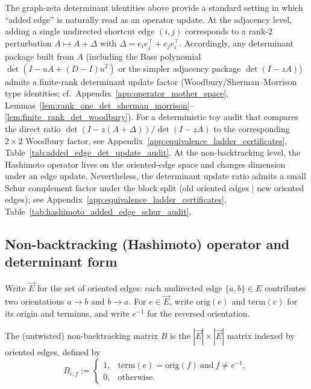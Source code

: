 \begin{remark}
\AuditTag The graph-zeta determinant identities above provide a standard setting in which ``added edge'' is naturally read as an operator update.
At the adjacency level, adding a single undirected shortcut edge $(i,j)$ corresponds to a rank-$2$ perturbation $A\mapsto A+\Delta$ with
$\Delta=e_ie_j^\top+e_je_i^\top$.
Accordingly, any determinant package built from $A$ (including the Bass polynomial $\det(I-uA+(D-I)u^2)$ or the simpler adjacency package $\det(I-zA)$)
admits a finite-rank determinant update factor (Woodbury/Sherman--Morrison type identities; cf.\ Appendix~\ref{app:operator_mother_space},
Lemmas~\ref{lem:rank_one_det_sherman_morrison}--\ref{lem:finite_rank_det_woodbury}).
For a deterministic toy audit that compares the direct ratio $\det(I-z(A+\Delta))/\det(I-zA)$ to the corresponding $2\times2$ Woodbury factor, see
Appendix~\ref{app:equivalence_ladder_certificates}, Table~\ref{tab:added_edge_det_update_audit}.
\AuditTag At the non-backtracking level, the Hashimoto operator lives on the oriented-edge space and changes dimension under an edge update.
Nevertheless, the determinant update ratio admits a small Schur complement factor under the block split (old oriented edges | new oriented edges);
see Appendix~\ref{app:equivalence_ladder_certificates}, Table~\ref{tab:hashimoto_added_edge_schur_audit}.
\end{remark}

\subsection{Non-backtracking (Hashimoto) operator and determinant form}
\label{subsec:hashimoto_operator_det_form}

Write $\overrightarrow{E}$ for the set of oriented edges: each undirected edge $\{a,b\}\in E$ contributes two orientations $a\to b$ and $b\to a$.
For $e\in\overrightarrow{E}$, write $\mathrm{orig}(e)$ and $\mathrm{term}(e)$ for its origin and terminus, and write $e^{-1}$ for the reversed orientation.

\begin{definition}\label{def:hashimoto_matrix}
\MathTag The (untwisted) non-backtracking matrix $B$ is the $|\overrightarrow{E}|\times|\overrightarrow{E}|$ matrix indexed by oriented edges, defined by
\[
B_{e,f}:=
\begin{cases}
1, & \mathrm{term}(e)=\mathrm{orig}(f)\ \text{and}\ f\neq e^{-1},\\
0, & \text{otherwise}.
\end{cases}
\]
\end{definition}

